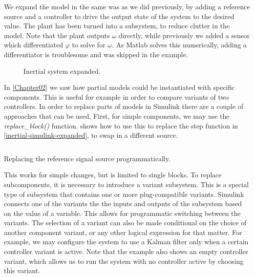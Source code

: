 \documentclass[\rootfolder/main.tex]{subfiles}
\begin{document}
We expand the model in the same was as we did previously, by adding a reference source and a controller to drive the output state of the system to the desired value.
The plant has been turned into a subsystem, to reduce clutter in the model.
Note that the plant outputs $\omega$ directly, while previously we added a sensor which differentiated $\varphi$ to solve for $\omega$.
As Matlab solves this numerically, adding a differentiator is troublesome and was skipped in the example.

\begin{figure}[ht]
    \centering
    \footnotesize
    
    \caption{Inertial system expanded.\label{fig:inertial-simulink-expanded}}
\end{figure}

In \ref{Chapter02} we saw how partial models could be instantiated with specific components.
This is useful for example in order to compare variants of two controllers.
In order to replace parts of models in Simulink there are a couple of approaches that can be used.
First, for simple components, we may use the \emph{replace\_block()} function.
 shows how to use this to replace the step function in \cref{inertial-simulink-expanded}, to swap in a different source.

\begin{listing}[ht]
    \inputminted[fontsize=\footnotesize, firstline=1, lastline=4]{matlab}{\rootfolder/Models/Matlab/ReplaceSource.m}
    \caption{Replacing the reference signal source programmatically.\label{lst:matlab-replace}}
\end{listing}

This works for simple changes, but is limited to single blocks.
To replace subcomponents, it is necessary to introduce a variant subsystem.
This is a special type of subsystem that contains one or more plug-compatible variants.
Simulink connects one of the variants the the inputs and outputs of the subsystem based on the value of a variable.
This allows for programmatic switching between the variants.
The selection of a variant can also be made conditional on the choice of another component variant, or any other logical expression for that matter.
For example, we may configure the system to use a Kalman filter only when a certain controller variant is active.
Note that the example also shows an empty controller variant, which allows us to run the system with no controller active by choosing this variant.
\end{document}
